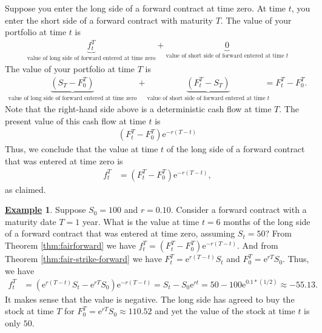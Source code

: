 \documentclass[12pt]{book}
\numberwithin{equation}{chapter}
\theoremstyle{plain}
\numberwithin{theorem}{section}
\theoremstyle{definition}
\newtheorem{example}[theorem]{\underline{Example}}
\numberwithin{exercise}{chapter}
\let\oldendproof\endproof
\renewenvironment{proof}[1][\proofname]{%
  \oldproof[\scshape\underline{#1}]%
}{\oldendproof}
\newcommand{\<}{\langle}
\renewcommand{\>}{\rangle}
\renewcommand{\(}{\left(}
\renewcommand{\)}{\right)}
\renewcommand{\[}{\left[}
\renewcommand{\]}{\right]}
\newcommand\ee{\mathrm{e}}
\theoremstyle{definition}
\numberwithin{question}{section}
\begin{document}
\begin{proof}
Suppose you enter the long side of a forward contract at time zero.  At time $t$, you enter the short side of a forward contract with maturity $T$.
The value of your portfolio at time $t$ is
\begin{align}
\underbrace{f_t^T}_{\text{value of long side of forward entered at time zero}} + \underbrace{0}_{\text{value of short side of forward entered at time $t$}}
\end{align}
The value of your portfolio at time $T$ is
\begin{align}
\underbrace{\( S_T - F_0^T \) }_{\text{value of long side of forward entered at time zero}} + \underbrace{\( F_t^T - S_T \) }_{\text{value of short side of forward entered at time $t$}}
	&= F_t^T - F_0^T .
\end{align}
Note that the right-hand side above is a deterministic cash flow at time $T$. The present value of this cash flow at time $t$ is
\begin{align}
\( F_t^T - F_0^T \) \ee^{-r(T-t)}
\end{align}
Thus, we conclude that the value at time $t$ of the long side of a forward contract that was entered at time zero is
\begin{align}
f_t^T	
	&=	\( F_t^T - F_0^T \) \ee^{-r(T-t)} ,
\end{align}
as claimed.
\end{proof}

\begin{example}
Suppose $S_0 = 100$ and $r = 0.10$.  Consider a forward contract with a maturity date $T = 1$ year. What is the value at time $t = 6$ months of the long side of a forward contract that was entered at time zero, assuming $S_t = 50$?
From Theorem \ref{thm:fairforward} we have $f_t^T = ( F_t^T - F_0^T ) \ee^{-r(T-t)}$.  And from Theorem \ref{thm:fair-strike-forward} we have $F_t^T = \ee^{r(T-t)} S_t$ and $F_0^T = \ee^{r T} S_0$.  Thus, we have
\begin{align}
f_t^T 
	&= ( \ee^{r(T-t)} S_t -  \ee^{rT} S_0) \ee^{-r(T-t)}
	=  S_t - S_0 \ee^{rt} = 50 - 100 \ee^{0.1 * (1/2)} \approx - 55.13 .
\end{align}
It makes sense that the value is negative.  The long side has agreed to buy the stock at time $T$ for $F_0^T = \ee^{rT} S_0 \approx 110.52$ and yet the value of the stock at time $t$ is only $50$.
\end{example}
\end{document}
